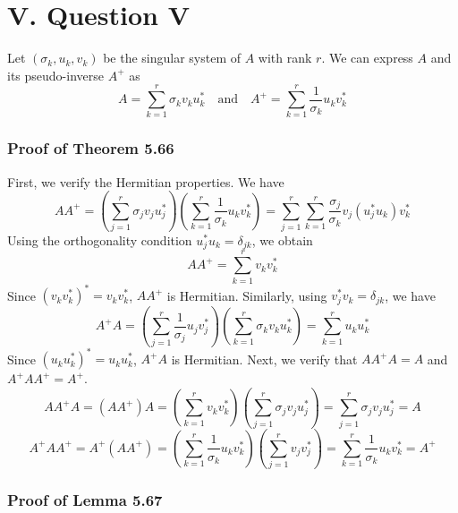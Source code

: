 \documentclass[a4paper]{article}
\begin{document}
\section*{V. Question V}


Let $(\sigma_k, u_k, v_k)$ be the singular system of $A$ with rank $r$. We can express $A$ and its pseudo-inverse $A^+$ as
\begin{equation}
  A = \sum_{k=1}^r \sigma_k v_k u_k^* \quad \text{and} \quad A^+ = \sum_{k=1}^r \frac{1}{\sigma_k} u_k v_k^*
\end{equation}

\subsubsection*{Proof of Theorem 5.66}

First, we verify the Hermitian properties. We have
\begin{equation}
  AA^+ = \left(\sum_{j=1}^r \sigma_j v_j u_j^*\right) \left(\sum_{k=1}^r \frac{1}{\sigma_k} u_k v_k^*\right) = \sum_{j=1}^r \sum_{k=1}^r \frac{\sigma_j}{\sigma_k} v_j (u_j^* u_k) v_k^*
\end{equation}
Using the orthogonality condition $u_j^* u_k = \delta_{jk}$, we obtain
\begin{equation}
  AA^+ = \sum_{k=1}^r v_k v_k^*
\end{equation}
Since $(v_k v_k^*)^* = v_k v_k^*$, $AA^+$ is Hermitian. Similarly, using $v_j^* v_k = \delta_{jk}$, we have
\begin{equation}
  A^+A = \left(\sum_{j=1}^r \frac{1}{\sigma_j} u_j v_j^*\right) \left(\sum_{k=1}^r \sigma_k v_k u_k^*\right) = \sum_{k=1}^r u_k u_k^*
\end{equation}
Since $(u_k u_k^*)^* = u_k u_k^*$, $A^+A$ is Hermitian.
Next, we verify that $A A^+ A = A$ and $A^+ A A^+ = A^+$.
\begin{equation}
  AA^+A = (AA^+)A = \left(\sum_{k=1}^r v_k v_k^*\right) \left(\sum_{j=1}^r \sigma_j v_j u_j^*\right) = \sum_{j=1}^r \sigma_j v_j u_j^* = A
\end{equation}
\begin{equation}
  A^+AA^+ = A^+(AA^+) = \left(\sum_{k=1}^r \frac{1}{\sigma_k} u_k v_k^*\right) \left(\sum_{j=1}^r v_j v_j^*\right) = \sum_{k=1}^r \frac{1}{\sigma_k} u_k v_k^* = A^+
\end{equation}

\subsubsection*{Proof of Lemma 5.67}
\end{document}
